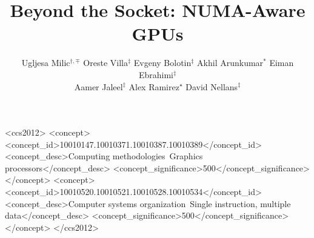 \documentclass[sigconf]{acmart}
\begin{document}


\newcommand*\circled[1]{\tikz[baseline=(char.base)]{
  \node[shape=circle,draw,inner sep=1pt] (char) {#1};}}

\title{Beyond the Socket: NUMA-Aware GPUs}

\author{Ugljesa Milic$^{\dagger,\mp}$ \hspace{0.2cm} Oreste Villa$^{\ddagger}$ \hspace{0.2cm} Evgeny Bolotin$^{\ddagger}$ \hspace{0.2cm} Akhil Arunkumar$^{\ast}$ \hspace{0.2cm} Eiman Ebrahimi$^{\ddagger}$ \\ Aamer Jaleel$^{\ddagger}$ \hspace{0.2cm} Alex Ramirez$^{\star}$ \hspace{0.2cm} David Nellans$^{\ddagger}$ \vspace{0.5cm}}


\renewcommand{\shortauthors}{U. Milic et al.}



%
%
\begin{CCSXML}
	<ccs2012>
	<concept>
	<concept_id>10010147.10010371.10010387.10010389</concept_id>
	<concept_desc>Computing methodologies~Graphics processors</concept_desc>
	<concept_significance>500</concept_significance>
	</concept>
	<concept>
	<concept_id>10010520.10010521.10010528.10010534</concept_id>
	<concept_desc>Computer systems organization~Single instruction, multiple data</concept_desc>
	<concept_significance>500</concept_significance>
	</concept>
	</ccs2012>
\end{CCSXML}
\end{document}
